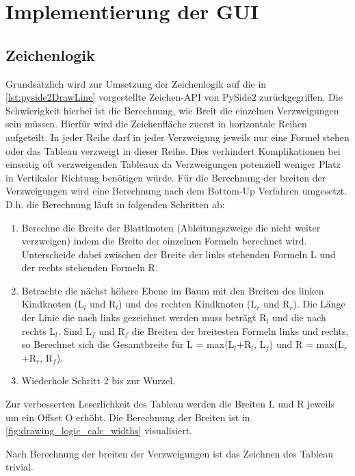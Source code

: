 \section{Implementierung der \ac{GUI}\label{sec:ui_impl}}
\subsection{Zeichenlogik}
Grundsätzlich wird zur Umsetzung der Zeichenlogik auf die in \autoref{lst:pyside2DrawLine} vorgestellte Zeichen-API von PySide2 zurückgegriffen. Die Schwierigkeit hierbei ist die Berechnung, wie Breit die einzelnen Verzweigungen sein müssen. Hierfür wird die Zeichenfläche zuerst in horizontale Reihen aufgeteilt. In jeder Reihe darf in jeder Verzweigung jeweils nur eine Formel stehen oder das Tableau verzweigt in dieser Reihe. Dies verhindert Komplikationen bei einseitig oft verzweigenden Tableaux da Verzweigungen potenziell weniger Platz in Vertikaler Richtung benötigen würde. Für die Berechnung der breiten der Verzweigungen wird eine Berechnung nach dem Bottom-Up Verfahren umgesetzt. D.h. die Berechnung läuft in folgenden Schritten ab:
\begin{enumerate}
\item Berechne die Breite der Blattknoten (Ableitungszweige die nicht weiter verzweigen) indem die Breite der einzelnen Formeln berechnet wird. Unterscheide dabei zwischen der Breite der links stehenden Formeln L und der rechts stehenden Formeln R.

\item Betrachte die nächst höhere Ebene im Baum mit den Breiten des linken Kindknoten (L$_{l}$ und R$_{l}$) und des rechten Kindknoten (L$_{r}$ und R$_{r}$). Die Länge der Linie die nach links gezeichnet werden muss beträgt R$_{l}$ und die nach rechts L$_{l}$. Sind L$_{f}$ und R$_{f}$ die Breiten der breitesten Formeln links und rechts, so Berechnet sich die Gesamtbreite für L = max(L$_{l}$+R$_{l}$, L$_{f}$) und R = max(L$_{r}$+R$_{r}$, R$_{f}$).

\item Wiederhole Schritt 2 bis zur Wurzel.
\end{enumerate}

Zur verbesserten Leserlichkeit des Tableau werden die Breiten L und R jeweils um ein Offset O erhöht. Die Berechnung der Breiten ist in \autoref{fig:drawing_logic_calc_widths} visualisiert.

Nach Berechnung der breiten der Verzweigungen ist das Zeichnen des Tableau trivial.

